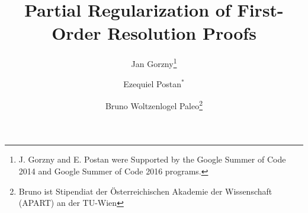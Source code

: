 \documentclass{easychair}
\theoremstyle{definition}
\begin{document}
\title{Partial Regularization of First-Order Resolution Proofs}


\author{Jan Gorzny\thanks{J. Gorzny and E. Postan were Supported by the Google Summer of Code 2014 and Google Summer of Code 2016 programs.}  \and Ezequiel Postan$^*$ \and Bruno Woltzenlogel Paleo\thanks{Bruno ist Stipendiat der \"{O}sterreichischen Akademie der Wissenschaft (APART) an der TU-Wien}}


  \maketitle



\end{document}
